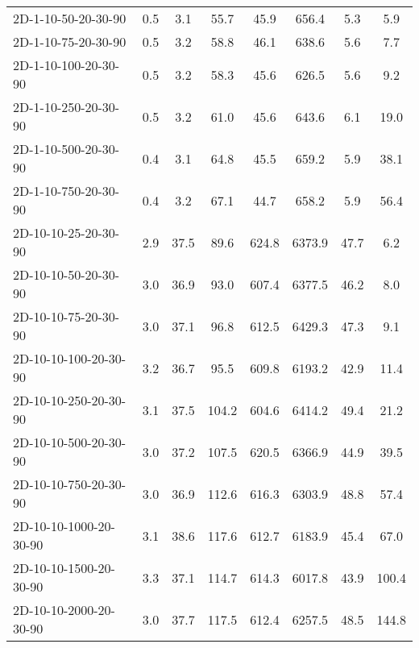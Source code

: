 \documentclass{article}
\begin{document}
\begin{center}
\begin{table}[h]
\begin{tabular}{|l||c|c|c|c|c|c|c|}
            2D-1-10-50-20-30-90            & 0.5  & 3.1       & 55.7       & 45.9        & 656.4    & 5.3       & 5.9        \\
            2D-1-10-75-20-30-90            & 0.5  & 3.2       & 58.8       & 46.1        & 638.6    & 5.6       & 7.7        \\
            2D-1-10-100-20-30-90           & 0.5  & 3.2       & 58.3       & 45.6        & 626.5    & 5.6       & 9.2        \\
            2D-1-10-250-20-30-90           & 0.5  & 3.2       & 61.0       & 45.6        & 643.6    & 6.1       & 19.0       \\
            2D-1-10-500-20-30-90           & 0.4  & 3.1       & 64.8       & 45.5        & 659.2    & 5.9       & 38.1       \\
            2D-1-10-750-20-30-90           & 0.4  & 3.2       & 67.1       & 44.7        & 658.2    & 5.9       & 56.4       \\
            \hline
            2D-10-10-25-20-30-90           & 2.9  & 37.5      & 89.6       & 624.8       & 6373.9   & 47.7      & 6.2        \\
            2D-10-10-50-20-30-90           & 3.0  & 36.9      & 93.0       & 607.4       & 6377.5   & 46.2      & 8.0        \\
            2D-10-10-75-20-30-90           & 3.0  & 37.1      & 96.8       & 612.5       & 6429.3   & 47.3      & 9.1        \\
            2D-10-10-100-20-30-90          & 3.2  & 36.7      & 95.5       & 609.8       & 6193.2   & 42.9      & 11.4       \\
            2D-10-10-250-20-30-90          & 3.1  & 37.5      & 104.2      & 604.6       & 6414.2   & 49.4      & 21.2       \\
            2D-10-10-500-20-30-90          & 3.0  & 37.2      & 107.5      & 620.5       & 6366.9   & 44.9      & 39.5       \\
            2D-10-10-750-20-30-90          & 3.0  & 36.9      & 112.6      & 616.3       & 6303.9   & 48.8      & 57.4       \\
            2D-10-10-1000-20-30-90         & 3.1  & 38.6      & 117.6      & 612.7       & 6183.9   & 45.4      & 67.0       \\
            2D-10-10-1500-20-30-90         & 3.3  & 37.1      & 114.7      & 614.3       & 6017.8   & 43.9      & 100.4      \\
            2D-10-10-2000-20-30-90         & 3.0  & 37.7      & 117.5      & 612.4       & 6257.5   & 48.5      & 144.8      \\

\end{tabular}
\end{table}
\end{center}
\end{document}
